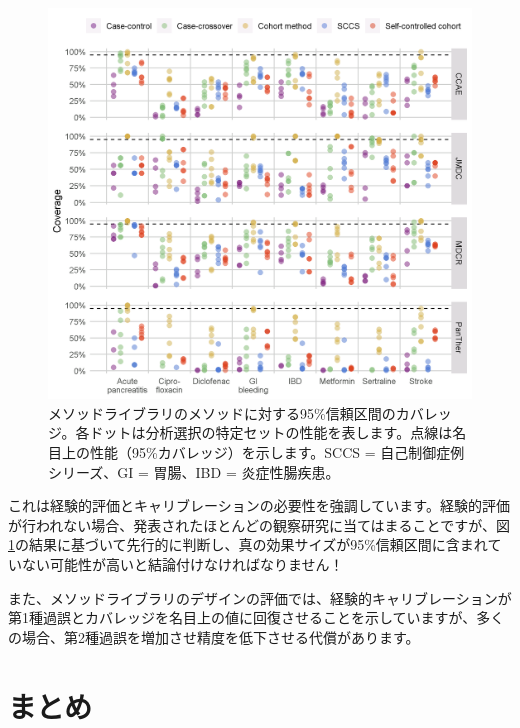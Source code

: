 \documentclass[
  11pt]{book}
\theoremstyle{definition}
\theoremstyle{definition}
\theoremstyle{definition}
\theoremstyle{definition}
\theoremstyle{remark}
\begin{document}
\begin{figure}[h]

{\centering \includegraphics[width=1\linewidth]{images/MethodValidity/methodEval} 

}

\caption{メソッドライブラリのメソッドに対する95\%信頼区間のカバレッジ。各ドットは分析選択の特定セットの性能を表します。点線は名目上の性能（95\%カバレッジ）を示します。SCCS = 自己制御症例シリーズ、GI = 胃腸、IBD = 炎症性腸疾患。}\label{fig:methodEval}
\end{figure}

これは経験的評価とキャリブレーションの必要性を強調しています。経験的評価が行われない場合、発表されたほとんどの観察研究に当てはまることですが、図\ref{fig:methodEval}の結果に基づいて先行的に判断し、真の効果サイズが95\%信頼区間に含まれていない可能性が高いと結論付けなければなりません！

また、メソッドライブラリのデザインの評価では、経験的キャリブレーションが第1種過誤とカバレッジを名目上の値に回復させることを示していますが、多くの場合、第2種過誤を増加させ精度を低下させる代償があります。

\section{まとめ}\label{ux307eux3068ux3081-13}
\end{document}
